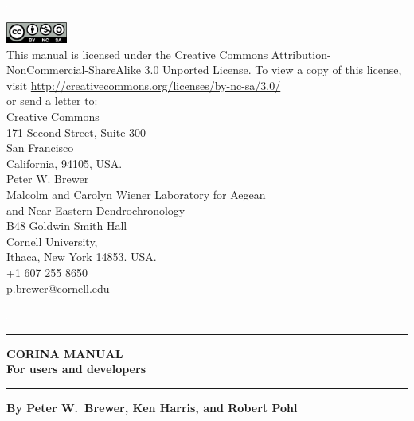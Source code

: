 
%

\thispagestyle{empty} 
\includegraphics{Images/pixel.png}
\vfill
\parbox[b]{11cm}{\raggedright
\includegraphics[width=2cm]{Images/by-nc-sa.png}\\
This manual is licensed under the Creative Commons Attribution-NonCommercial-ShareAlike 3.0 Unported License. To view a copy of this license, visit \url{http://creativecommons.org/licenses/by-nc-sa/3.0/} \\or send a letter to:\\
Creative Commons\\ 171 Second Street, Suite 300\\ San Francisco\\ California, 94105, USA.\\[1cm]


 Peter W. Brewer\\ Malcolm and Carolyn Wiener Laboratory for Aegean\\ and Near Eastern Dendrochronology \\
B48 Goldwin Smith Hall\\ Cornell University, \\ Ithaca, New York 14853. USA.\\[0.5cm] \Telefon\hspace{3mm}+1 607 255 8650 \\ \Letter\hspace{3mm}p.brewer@cornell.edu}

\newpage
{}
\setcounter{page}{1}
\thispagestyle{empty} 
{ \includegraphics{Images/pixel.png}\\[4cm] 
\hrule 
\vspace{5mm}
\Huge \bfseries CORINA MANUAL\\[3mm] 
\large{For users and developers}
\vspace{5mm}
\hrule
\vspace{3cm}
}
{
\normalsize
\textbf{By Peter W.\ Brewer, Ken Harris, and Robert Pohl}\\[0.6cm]


}

\newpage


